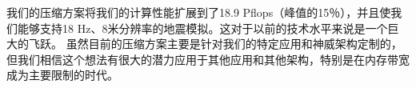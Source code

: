 \documentclass[degree=doctor]{thuthesis}
\begin{document}
我们的压缩方案将我们的计算性能扩展到了18.9 Pflops（峰值的15％），并且使我们能够支持18 Hz、8米分辨率的地震模拟。这对于以前的技术水平来说是一个巨大的飞跃。 虽然目前的压缩方案主要是针对我们的特定应用和神威架构定制的，但我们相信这个想法有很大的潜力应用于其他应用和其他架构，特别是在内存带宽成为主要限制的时代。


%
%


\backmatter

\listoffigures
\listoftables
\listofequations



% 





%



%
\end{document}
